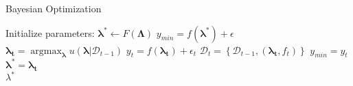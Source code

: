  
\begin{algorithm}
	\caption{Bayesian Optimization}
	\label{alg:bo}
	
	\begin{algorithmic}
		\State Initialize parameters: $\mathbf{\lambda^*} \gets F(\mathbf{\Lambda})$
		\State $y_{min} = f(\mathbf{\lambda^*}) + \epsilon$
		\State {}
		\State $\mathbf{\lambda_t} = \operatorname*{argmax}_{\mathbf{\lambda}} u(\mathbf{\lambda}|\mathcal{D}_{t-1})$ 
		\State $y_t = f(\mathbf{\lambda_t}) + \epsilon_t$
		\State $\mathcal{D}_t = \left\lbrace \mathcal{D}_{t-1}, (\mathbf{\lambda_t}, f_t) \right\rbrace $
		\State {}
		\State $y_{min} = y_t$
		\State $\mathbf{\lambda^*} = \mathbf{\lambda_t}$
		\EndIf
		\EndFor
		\\
		\Return $\lambda^*$
	\end{algorithmic}
\end{algorithm}

